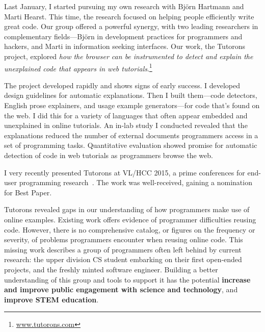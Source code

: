 \documentclass[12pt]{memoir}
\begin{document}
Last January, I started pursuing my own research with Bj\"{o}rn Hartmann and Marti Hearst.
This time, the research focused on helping people efficiently write great code.
Our group offered a powerful synergy, with two leading researchers in complementary fields---Bj\"{o}rn in development practices for programmers and hackers, and Marti in information seeking interfaces.
Our work, the Tutorons project, explored \emph{how the browser can be instrumented to detect and explain the unexplained code that appears in web tutorials}.\footnote{\url{www.tutorons.com}}

The project developed rapidly and shows signs of early success.
I developed design guidelines for automatic explanations.
Then I built them---code detectors, English prose explainers, and usage example generators---for code that's found on the web.
I did this for a variety of languages that often appear embedded and unexplained in online tutorials.
An in-lab study I conducted revealed that the explanations reduced the number of external documents programmers access in a set of programming tasks.
Quantitative evaluation showed promise for automatic detection of code in web tutorials as programmers browse the web.

I very recently presented Tutorons at VL/HCC 2015, a prime conferences for end-user programming research~\cite{head_tutorons_2015}.
The work was well-received, gaining a nomination for Best Paper.

Tutorons revealed gaps in our understanding of how programmers make use of online examples.
Existing work offers evidence of programmer difficulties reusing code.
However, there is no comprehensive catalog, or figures on the frequency or severity, of problems programmers encounter when reusing online code.
This missing work describes a group of programmers often left behind by current research: the upper division CS student embarking on their first open-ended projects, and the freshly minted software engineer.
Building a better understanding of this group and tools to support it has the potential \textbf{increase and improve public engagement with science and technology}, and \textbf{improve STEM education}.
\end{document}
